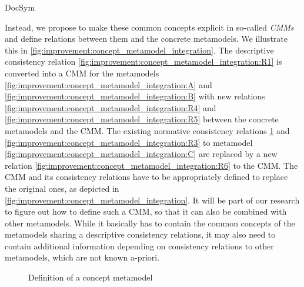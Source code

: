 \begin{copiedFrom}{DocSym}

Instead, we propose to make these common concepts explicit in so-called \emph{\glspl{CMM}} and define relations between them and the concrete metamodels.
We illustrate this in \autoref{fig:improvement:concept_metamodel_integration}.
The descriptive consistency relation \ref{fig:improvement:concept_metamodel_integration:R1} is converted into a \gls{CMM} for the metamodels \ref{fig:improvement:concept_metamodel_integration:A} and \ref{fig:improvement:concept_metamodel_integration:B} with new relations \ref{fig:improvement:concept_metamodel_integration:R4} and \ref{fig:improvement:concept_metamodel_integration:R5} between the concrete metamodels and the \gls{CMM}.
The existing normative consistency relations \ref{fig:improvement:concept_metamodel_integration} and \ref{fig:improvement:concept_metamodel_integration:R3} to metamodel \ref{fig:improvement:concept_metamodel_integration:C} are replaced by a new relation \ref{fig:improvement:concept_metamodel_integration:R6} to the \gls{CMM}. %
The \gls{CMM} and its consistency relations have to be appropriately defined to replace the original ones, as depicted in \autoref{fig:improvement:concept_metamodel_integration}. %
It will be part of our research to figure out how to define such a \gls{CMM}, so that it can also be combined with other metamodels. %
While it basically has to contain the common concepts of the metamodels sharing a descriptive consistency relations, it may also need to contain additional information depending on consistency relations to other metamodels, which are not known a-priori.

\begin{figure}
    \centering
    
    \caption{Definition of a concept metamodel}
    \label{fig:improvement:concept_metamodel_integration}
\end{figure}

\end{copiedFrom} %